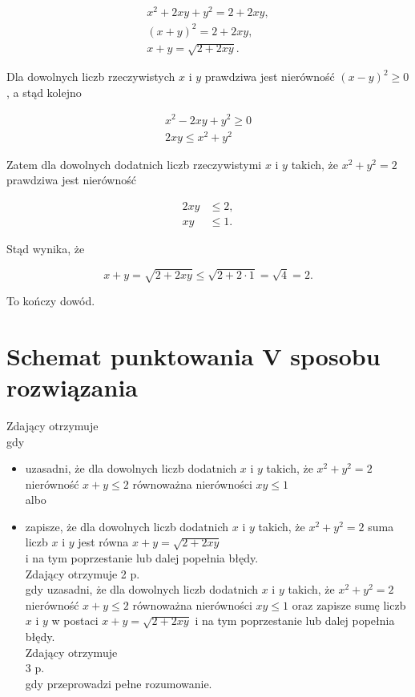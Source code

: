 \documentclass[10pt]{article}
\begin{document}
$$
\begin{gathered}
x^{2}+2 x y+y^{2}=2+2 x y, \\
(x+y)^{2}=2+2 x y, \\
x+y=\sqrt{2+2 x y} .
\end{gathered}
$$

Dla dowolnych liczb rzeczywistych $x$ i $y$ prawdziwa jest nierówność $(x-y)^{2} \geq 0$, a stąd kolejno

$$
\begin{gathered}
x^{2}-2 x y+y^{2} \geq 0 \\
2 x y \leq x^{2}+y^{2}
\end{gathered}
$$

Zatem dla dowolnych dodatnich liczb rzeczywistymi $x$ i $y$ takich, że $x^{2}+y^{2}=2$ prawdziwa jest nierówność

$$
\begin{aligned}
2 x y & \leq 2, \\
x y & \leq 1 .
\end{aligned}
$$

Stąd wynika, że

$$
x+y=\sqrt{2+2 x y} \leq \sqrt{2+2 \cdot 1}=\sqrt{4}=2 .
$$

To kończy dowód.

\section*{Schemat punktowania V sposobu rozwiązania}
Zdający otrzymuje\\
gdy

\begin{itemize}
  \item uzasadni, że dla dowolnych liczb dodatnich $x$ i $y$ takich, że $x^{2}+y^{2}=2$ nierówność $x+y \leq 2$ równoważna nierówności $x y \leq 1$\\
albo
  \item zapisze, że dla dowolnych liczb dodatnich $x$ i $y$ takich, że $x^{2}+y^{2}=2$ suma liczb $x$ i $y$ jest równa $x+y=\sqrt{2+2 x y}$\\
i na tym poprzestanie lub dalej popełnia błędy.\\
Zdający otrzymuje 2 p.\\
gdy uzasadni, że dla dowolnych liczb dodatnich $x$ i $y$ takich, że $x^{2}+y^{2}=2$ nierówność $x+y \leq 2$ równoważna nierówności $x y \leq 1$ oraz zapisze sumę liczb $x$ i $y$ w postaci $x+y=\sqrt{2+2 x y}$ i na tym poprzestanie lub dalej popełnia błędy.\\
Zdający otrzymuje\\
3 p.\\
gdy przeprowadzi pełne rozumowanie.
\end{itemize}
\end{document}

